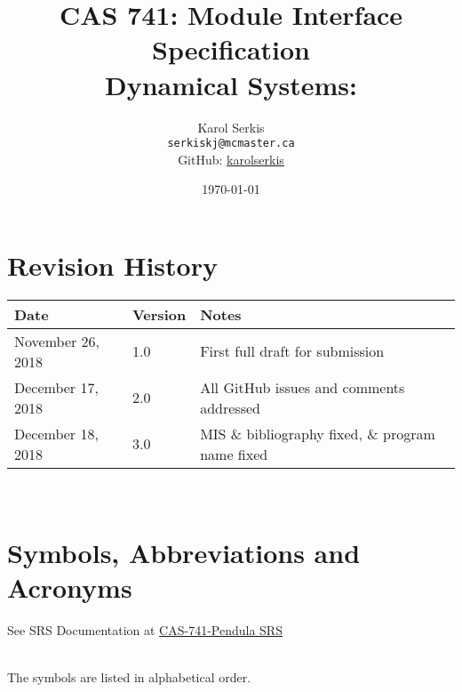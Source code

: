 \documentclass[12pt, titlepage]{article}
\begin{document}
\title{CAS 741: Module Interface Specification\\[10pt]\Large Dynamical 
Systems: \progname}
\author{Karol Serkis\\\texttt{serkiskj@mcmaster.ca}\\GitHub:
\href{https://www.github.com/karolserkis}{karolserkis}}
\date{\today}

\maketitle


\section{Revision History}

\begin{tabularx}{\textwidth}{p{4cm}p{2cm}X}
\toprule {\bf Date} & {\bf Version} & {\bf Notes}\\
\midrule
November 26, 2018 & 1.0 &  First full draft for submission\\
December 17, 2018 & 2.0 & All GitHub issues and comments addressed \\
December 18, 2018 & 3.0 & MIS \& bibliography fixed, 
\& program name fixed \\
\bottomrule
\end{tabularx}

~\newpage

\section{Symbols, Abbreviations and Acronyms}

See SRS Documentation at 
\href{https://github.com/karolserkis/CAS-741-Pendula/
blob/master/docs/SRS/SRS.pdf}{CAS-741-Pendula SRS}

\\
The symbols are listed in alphabetical order.\\
\end{document}

